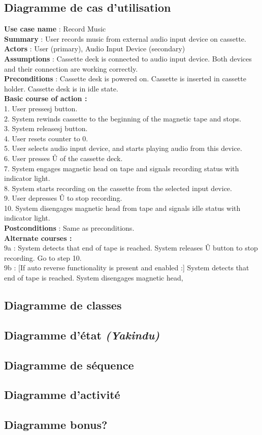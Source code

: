 \documentclass[11pt]{article}
\begin{document}
\subsection{Diagramme de cas d'utilisation}
\textbf{Use case name} : Record Music\\
\textbf{Summary} : User records music from external audio input device on cassette.\\
\textbf{Actors} : User (primary), Audio Input Device (secondary)\\
\textbf{Assumptions} : Cassette deck is connected to audio input device. Both devices and their connection are working
correctly.\\
\textbf{Preconditions} : Cassette desk is powered on. Cassette is inserted in cassette holder. Cassette desk is in idle state.\\
\textbf{Basic course of action :}\\
1. User pressesj button.\\
2. System rewinds cassette to the beginning of the magnetic tape and stops.\\
3. System releasesj button.\\
4. User resets counter to 0.\\
5. User selects audio input device, and starts playing audio from this device.\\
6. User presses Û of the cassette deck.\\
7. System engages magnetic head on tape and signals recording status with indicator light.\\
8. System starts recording on the cassette from the selected input device.\\
9. User depresses Û to stop recording.\\
10. System disengages magnetic head from tape and signals idle status with indicator light.\\
\textbf{Postconditions} : Same as preconditions.\\
\textbf{Alternate courses :}\\
9a : System detects that end of tape is reached. System releases Û button to stop recording. Go to step 10.\\
9b : [If auto reverse functionality is present and enabled :] System detects that end of tape is reached. System
disengages magnetic head,
\subsection{Diagramme de classes}
\subsection{Diagramme d'état \textit{(Yakindu)}}
\subsection{Diagramme de séquence}
\subsection{Diagramme d'activité}
\subsection{Diagramme bonus?}
\end{document}

